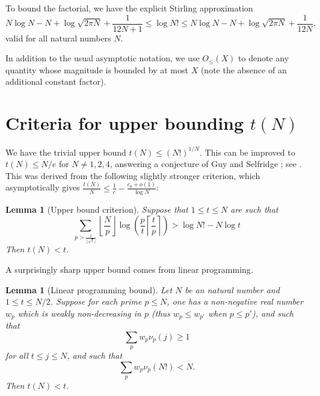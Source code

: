 \documentclass[12pt,a4paper,reqno]{amsart}
\numberwithin{equation}{section}
\theoremstyle{plain}
\newtheorem{lemma}[theorem]{Lemma}
\theoremstyle{definition}
\begin{document}
To bound the factorial, we have the explicit Stirling approximation \cite{robbins}
\begin{equation}\label{stirling}
  N \log N - N + \log \sqrt{2\pi N} + \frac{1}{12N+1} \leq \log N! \leq N \log N - N + \log \sqrt{2\pi N} + \frac{1}{12N},
\end{equation}
valid for all natural numbers $N$. 

In addition to the usual asymptotic notation, we use $O_{\leq}(X)$ to denote any quantity whose magnitude is bounded by at most $X$ (note the absence of an additional constant factor).


  
\section{Criteria for upper bounding \texorpdfstring{$t(N)$}{t(N)}}

We have the trivial upper bound $t(N) \leq (N!)^{1/N}$.  This can be improved to $t(N) \leq N/e$ for $N \neq 1,2,4$, answering a conjecture of Guy and Selfridge \cite{guy-selfridge}; see \cite{tao}.  This was derived from the following slightly stronger criterion, which asymptotically gives $\frac{t(N)}{N} \leq \frac{1}{e} - \frac{c_0+o(1)}{\log N}$:

\begin{lemma}[Upper bound criterion]\label{upper-crit}  \cite[Lemma 2.1]{tao} Suppose that $1 \leq t \leq N$ are such that
  \begin{equation}\label{contra}
     \sum_{p > \frac{t}{\lfloor\sqrt{t}\rfloor}} \left\lfloor \frac{N}{p} \right\rfloor \log \left( \frac{p}{t} \left\lceil \frac{t}{p} \right\rceil \right) > \log N! - N \log t
  \end{equation}
  Then $t(N) < t$.
  \end{lemma}

A surprisingly sharp upper bound comes from linear programming.

\begin{lemma}[Linear programming bound]\label{lp-upper}  Let $N$ be an natural number and $1 \leq t \leq N/2$.  Suppose for each prime $p \leq N$, one has a non-negative real number $w_p$ which is weakly non-decreasing in $p$ (thus $w_p \leq w_{p'}$ when $p \leq p'$), and such that
\begin{equation}\label{pj}
 \sum_p w_p \nu_p(j) \geq 1
\end{equation}
for all $t \leq j \leq N$, and such that
\begin{equation}\label{hyp}
\sum_p w_p \nu_p(N!) < N.
\end{equation}
Then $t(N) < t$.
\end{lemma}
\end{document}
